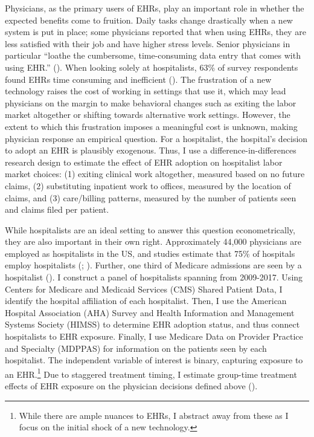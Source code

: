 \documentclass[12pt]{article}
\begin{document}
Physicians, as the primary users of EHRs, play an important role in whether the expected benefits come to fruition. Daily tasks change drastically when a new system is put in place; some physicians reported that when using EHRs, they are less satisfied with their job and have higher stress levels. Senior physicians in particular “loathe the cumbersome, time-consuming data entry that comes with using EHR.” (\cite{CollierBurnout}). When looking solely at hospitalists, 63\% of survey respondents found EHRs time consuming and inefficient (\cite{czernik2022hospitalist}). The frustration of a new technology raises the cost of working in settings that use it, which may lead physicians on the margin to make behavioral changes such as exiting the labor market altogether or shifting towards alternative work settings. However, the extent to which this frustration imposes a meaningful cost is unknown, making physician response an empirical question. For a hospitalist, the hospital's decision to adopt an EHR is plausibly exogenous. Thus, I use a difference-in-differences research design to estimate the effect of EHR adoption on hospitalist labor market choices: (1) exiting clinical work altogether, measured based on no future claims, (2) substituting inpatient work to offices, measured by the location of claims, and (3) care/billing patterns, measured by the number of patients seen and claims filed per patient.

While hospitalists are an ideal setting to answer this question econometrically, they are also important in their own right. Approximately 44,000 physicians are employed as hospitalists in the US, and studies estimate that 75\% of hospitals employ hospitalists (\cite{bls}; \cite{healthecareers_2022}). Further, one third of Medicare admissions are seen by a hospitalist (\cite{messler2015history}). I construct a panel of hospitalists spanning from 2009-2017. Using Centers for Medicare and Medicaid Services (CMS) Shared Patient Data, I identify the hospital affiliation of each hospitalist. Then, I use the American Hospital Association (AHA) Survey and Health Information and Management Systems Society (HIMSS) to determine EHR adoption status, and thus connect hospitalists to EHR exposure. Finally, I use Medicare Data on Provider Practice and Specialty (MDPPAS) for information on the patients seen by each hospitalist. The independent variable of interest is binary, capturing exposure to an EHR.\footnote{While there are ample nuances to EHRs, I abstract away from these as I focus on the initial shock of a new technology.} Due to staggered treatment timing, I estimate group-time treatment effects of EHR exposure on the physician decisions defined above (\cite{callaway2021difference}).
\end{document}
